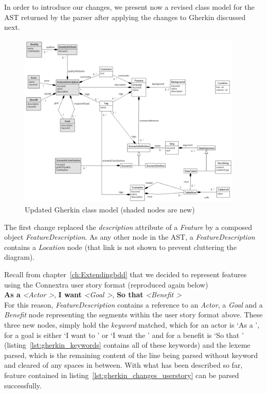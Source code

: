 \documentclass[dissertation,final]{softeng}
\begin{document}
In order to introduce our changes, we present now a revised class model for the AST returned by the parser after applying the changes to Gherkin discussed next.

\begin{figure}[h!]
\includegraphics[width=0.95\textwidth]{gherkin_ast_new2}
\centering
\caption[Updated Gherkin class model]{Updated Gherkin class model (shaded nodes are new)}
\label{fig:gherkin_ast_new}
\end{figure}

The first change replaced the \emph{description} attribute of a \emph{Feature} by a composed object \emph{FeatureDescription}. As any other node in the AST, a \emph{FeatureDescription} contains a \emph{Location} node (that link is not shown to prevent cluttering the diagram).

Recall from chapter~\ref{ch:Extendingbdd} that we decided to represent features using the Connextra user story format (reproduced again below)\\

\textbf{As a} \textit{\textless Actor \textgreater}, \textbf{I want} \textit{\textless Goal \textgreater}, \textbf{So that} \textit{\textless Benefit \textgreater} \\

For this reason, \emph{FeatureDescription} contains a reference to an \emph{Actor}, a \emph{Goal} and a \emph{Benefit} node representing the segments within the user story format above. These three new nodes, simply hold the \emph{keyword} matched, which for an actor is `As a ', for a goal is either `I want to ' or `I want the ' and for a benefit is `So that ' (listing~\ref{lst:gherkin_keywords} contains all of these keywords) and the lexeme parsed, which is the remaining content of the line being parsed without keyword and cleared of any spaces in between. With what has been described so far, feature contained in listing~\ref{lst:gherkin_changes_userstory} can be parsed successfully.
\end{document}
